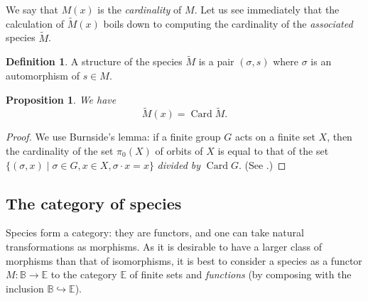 \documentclass{amsart}
\newtheorem{prop}[thm]{Proposition}
\theoremstyle{definition}
\newtheorem{defn}[thm]{Definition}
\theoremstyle{remark}
\newcommand{\B}{\mathbb{B}}
\newcommand{\E}{\mathbb{E}}
\newcommand{\inj}{\hookrightarrow}
\DeclareMathOperator{\Card}{Card}
\newcommand{\unl}[1]{\tilde{#1}}
\begin{document}
We say that $M (x)$ is the \emph{cardinality} of $M$. Let us see
immediately that the calculation of $\unl M (x)$ boils down to
computing the cardinality of the \emph{associated} species $\unl M$.

\begin{defn} \label{defn:unl}
  A structure of the species $\unl M$ is a pair $(\sigma, s)$ where
  $\sigma$ is an automorphism of $s \in M$.
\end{defn}

\begin{prop}
  We have
  \[ \unl M (x) = \Card {\unl M}. \]
\end{prop}

\begin{proof}
  We use Burnside's lemma: if a finite group $G$ acts on a finite set
  $X$, then the cardinality of the set $\pi_0(X)$ of orbits of $X$ is
  equal to that of the set $\{(\sigma, x) \mid \sigma \in G, x \in X,
  \sigma \cdot x = x\}$ \emph{divided by} $\Card G$. (See
  \citet[p. 191, Theorem VII]{burnside1955groups}.)
\end{proof}

\subsection{The category of species}
\label{sec:category-of-species}

Species form a category: they are functors, and one can take natural
transformations as morphisms. As it is desirable to have a larger
class of morphisms than that of isomorphisms, it is best to consider a
species as a functor $M: \B \to \E$ to the category $\E$ of finite
sets and \emph{functions} (by composing with the inclusion $\B \inj
\E$).
\end{document}
